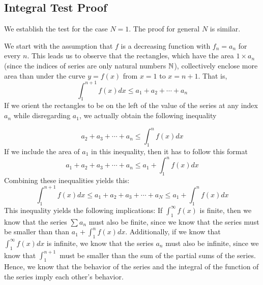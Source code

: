 \documentclass{report}
\begin{document}
\begin{sloppypar}
\subsection{Integral Test Proof}
We establish the test for the case $ N = 1 $. The proof
for general $ N $ is similar.
\par We start with the assumption that $ f $ is a decreasing
function with $ f_{n} = a_{n} $ for every $ n $. This
leads us to observe that the rectangles, which have
the area $ 1 \times a_{n} $ (since the indices of series
are only natural numbers $ \mathbb{N}$), collectively
enclose more area than under the curve $ y = f(x)$ from
$ x = 1 $ to $ x = n + 1 $. That is,
\[ \int_{1}^{n+1} f(x)dx \leq a_{1} + a_{2} + \cdots +
a_{n} \]
If we orient the rectangles to be on the left
of the value of the series at any index $ a_{n} $ while
disregarding $ a_{1}$,
we actually obtain the following inequality

\[ a_{2} + a_{3} + \cdots + a_{n} \leq \int_{1}^{n} f(x)dx\]
If we include the area of $ a_{1} $ in this inequality,
then it has to follow this format
\[ a_{1} + a_{2} + a_{3} + \cdots + a_{n} \leq a_{1} + \int_{1}^{n} f(x)dx\]
Combining these inequalities yields this:
\[ \int_{1}^{n+1} f(x)dx \leq a_{1} + a_{2} + a_{3} +
  \cdots + a_{N} \leq a_{1} + \int_{1}^{n} f(x)dx \]
This inequality yields the following implications:
If $ \int_{1}^{\infty} f(x) $ is finite, then we know
that the series $ \sum a_{n} $ must also be finite,
since we know that the series must be smaller than
than $ a_{1} + \int_{1}^{n} f(x)dx $. Additionally,
if we know that $ \int_{1}^{\infty} f(x)dx $ is infinite,
we know that the series $ a_{n} $ must also be infinite,
since we know that $ \int_{1}^{n+1} $ must be smaller
than the sum of the partial sums of the series. Hence,
we know that the behavior of the series and the
integral of the function of the series
imply each other's behavior.


\end{sloppypar}
\end{document}
